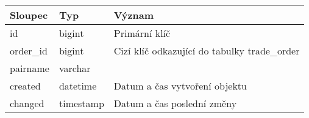 \begin{center}
    \begin{longtable}[t]{|l|C{4cm}|p{4cm}|}
        \hline
        Sloupec                              & Typ                                                                                                                                                                                                                  & Význam                                                                                                                            \\
        \hline
        id                                   & bigint                                                                                                                                                                                                               & Primární klíč                                                                                                                     \\
        order\_id                            & bigint                                                                                                                                                                                                               & Cizí klíč odkazující do tabulky trade\_order                                                                                      \\
        pairname                             & varchar                                                                                                                                                                                                                                                                                                                                                  \\
        created                              & datetime                                                                                                                                                                                                             & Datum a čas vytvoření objektu                                                                                                     \\
        changed                              & timestamp                                                                                                                                                                                                            & Datum a čas poslední změny                                                                                                        \\

\end{longtable}
\end{center}
